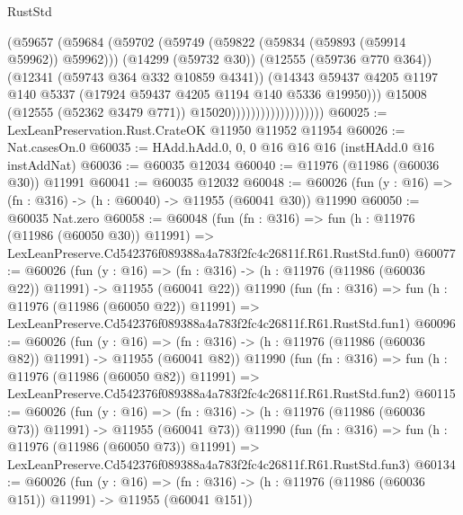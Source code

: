\begin{lexlean}{RustStd}
\begin{coremodule}
                                      (@59657
                                        (@59684
                                          (@59702
                                            (@59749
                                              (@59822 (@59834 (@59893 (@59914 @59962)) @59962)))
                                            (@14299 (@59732 @30))
                                            (@12555 (@59736 @770 @364))
                                            (@12341 (@59743 @364 @332 @10859 @4341))
                                            (@14343
                                              @59437
                                              @4205
                                              @1197
                                              @140
                                              @5337
                                              (@17924 @59437 @4205 @1194 @140 @5336 @19950)))
                                          @15008
                                          (@12555 (@52362 @3479 @771))
                                          @15020)))))))))))))))))))
@60025 := LexLeanPreservation.Rust.CrateOK @11950 @11952 @11954
@60026 := Nat.casesOn.{0}
@60035 := HAdd.hAdd.{0, 0, 0} @16 @16 @16 (instHAdd.{0} @16 instAddNat)
@60036 := @60035 @12034
@60040 := @11976 (@11986 (@60036 @30)) @11991
@60041 := @60035 @12032
@60048 := @60026 (fun (y : @16) => (fn : @316) -> (h : @60040) -> @11955 (@60041 @30)) @11990
@60050 := @60035 Nat.zero
@60058 := @60048
    (fun (fn : @316) =>
    fun (h : @11976 (@11986 (@60050 @30)) @11991) =>
    LexLeanPreserve.Cd542376f089388a4a783f2fc4c26811f.R61.RustStd.fun0)
@60077 := @60026
    (fun (y : @16) =>
    (fn : @316) -> (h : @11976 (@11986 (@60036 @22)) @11991) -> @11955 (@60041 @22))
    @11990
    (fun (fn : @316) =>
    fun (h : @11976 (@11986 (@60050 @22)) @11991) =>
    LexLeanPreserve.Cd542376f089388a4a783f2fc4c26811f.R61.RustStd.fun1)
@60096 := @60026
    (fun (y : @16) =>
    (fn : @316) -> (h : @11976 (@11986 (@60036 @82)) @11991) -> @11955 (@60041 @82))
    @11990
    (fun (fn : @316) =>
    fun (h : @11976 (@11986 (@60050 @82)) @11991) =>
    LexLeanPreserve.Cd542376f089388a4a783f2fc4c26811f.R61.RustStd.fun2)
@60115 := @60026
    (fun (y : @16) =>
    (fn : @316) -> (h : @11976 (@11986 (@60036 @73)) @11991) -> @11955 (@60041 @73))
    @11990
    (fun (fn : @316) =>
    fun (h : @11976 (@11986 (@60050 @73)) @11991) =>
    LexLeanPreserve.Cd542376f089388a4a783f2fc4c26811f.R61.RustStd.fun3)
@60134 := @60026
    (fun (y : @16) =>
    (fn : @316) -> (h : @11976 (@11986 (@60036 @151)) @11991) -> @11955 (@60041 @151))

\end{coremodule}
\end{lexlean}
